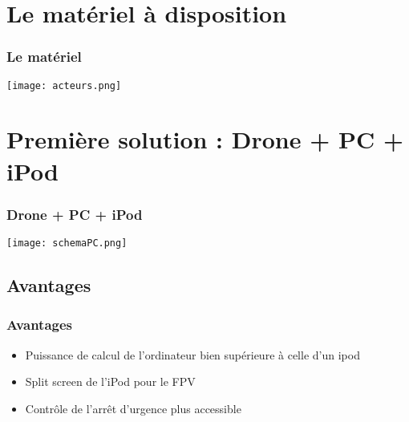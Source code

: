 \documentclass[11pt]{beamer}
\begin{document}

\section{Le matériel à disposition}
\begin{frame}
\frametitle{Le matériel}
\begin{center}
\texttt{[image: acteurs.png]}
\end{center}
\end{frame}


\section{Première solution : Drone + PC + iPod}
\begin{frame}
\frametitle{Drone + PC + iPod}
\texttt{[image: schemaPC.png]}
\end{frame}


\subsection{Avantages}
\begin{frame}
\frametitle{Avantages}

\begin{itemize}
\item Puissance de calcul de l'ordinateur bien supérieure à celle d'un ipod%
    
\item Split screen de l'iPod pour le FPV %
\item Contrôle de l'arrêt d'urgence plus accessible
\end{itemize}
\end{frame}

\end{document}
